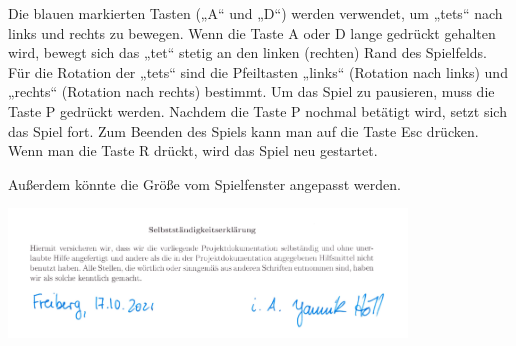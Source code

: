 \documentclass[11pt]{article}
\begin{document}
Die blauen markierten Tasten („A“ und „D“) werden verwendet, um „\glspl {tet}“ nach links und rechts zu bewegen. 
Wenn die Taste A oder D lange gedrückt gehalten wird, bewegt sich das „\gls {tet}“ stetig an den linken (rechten) Rand des Spielfelds. 
Für die Rotation der „\glspl {tet}“ sind die Pfeiltasten „links“ (Rotation nach links) und „rechts“ (Rotation nach rechts) bestimmt. 
Um das Spiel zu pausieren, muss die Taste P gedrückt werden. 
Nachdem die Taste P nochmal betätigt wird, setzt sich das Spiel fort. 
Zum Beenden des Spiels kann man auf die Taste Esc drücken. 
Wenn man die Taste R drückt, wird das Spiel neu gestartet.  

Außerdem könnte die Größe vom Spielfenster angepasst werden.  

\pagebreak

\vspace*{\fill}
\includegraphics[width=400px]{test.png}
\vspace*{\fill}

\pagebreak

\end{document}
